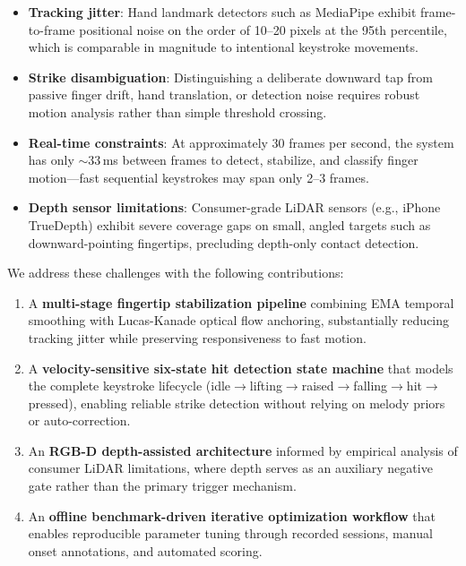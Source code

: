\documentclass[11pt,a4paper]{article}
\begin{document}
\begin{itemize}[nosep]
    \item \textbf{Tracking jitter}: Hand landmark detectors such as MediaPipe exhibit frame-to-frame positional noise on the order of 10--20 pixels at the 95th percentile, which is comparable in magnitude to intentional keystroke movements.
    \item \textbf{Strike disambiguation}: Distinguishing a deliberate downward tap from passive finger drift, hand translation, or detection noise requires robust motion analysis rather than simple threshold crossing.
    \item \textbf{Real-time constraints}: At approximately 30 frames per second, the system has only $\sim$33\,ms between frames to detect, stabilize, and classify finger motion---fast sequential keystrokes may span only 2--3 frames.
    \item \textbf{Depth sensor limitations}: Consumer-grade LiDAR sensors (e.g., iPhone TrueDepth) exhibit severe coverage gaps on small, angled targets such as downward-pointing fingertips, precluding depth-only contact detection.
\end{itemize}

We address these challenges with the following contributions:
\begin{enumerate}[nosep]
    \item A \textbf{multi-stage fingertip stabilization pipeline} combining EMA temporal smoothing with Lucas-Kanade optical flow anchoring, substantially reducing tracking jitter while preserving responsiveness to fast motion.
    \item A \textbf{velocity-sensitive six-state hit detection state machine} that models the complete keystroke lifecycle (idle$\to$lifting$\to$raised$\to$falling$\to$hit$\to$pressed), enabling reliable strike detection without relying on melody priors or auto-correction.
    \item An \textbf{RGB-D depth-assisted architecture} informed by empirical analysis of consumer LiDAR limitations, where depth serves as an auxiliary negative gate rather than the primary trigger mechanism.
    \item An \textbf{offline benchmark-driven iterative optimization workflow} that enables reproducible parameter tuning through recorded sessions, manual onset annotations, and automated scoring.
\end{enumerate}

\end{document}
